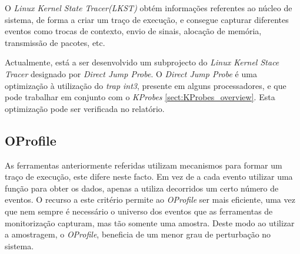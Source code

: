 O \textit{Linux Kernel State Tracer(LKST)} obtém informações referentes ao núcleo de sistema, de forma a criar um traço de execução, e consegue capturar diferentes eventos como trocas de contexto, envio de sinais, alocação de memória, transmissão de pacotes, etc.

\label{cap:djprobe}
Actualmente, está a ser desenvolvido um subprojecto do \textit{Linux Kernel Stace Tracer} designado por \textit{Direct Jump Probe}.
O \textit{Direct Jump Probe} é uma optimização à utilização do \textit{trap int3}, presente em alguns processadores, e que pode trabalhar em conjunto com o \textit{KProbes} \ref{sect:KProbes_overview}.
Esta optimização pode ser verificada no relatório\cite{Hiramatsu2005}.
 
\subsection{OProfile}\label{cap:Oprofile_overview}
As ferramentas anteriormente referidas utilizam mecanismos para formar um traço de execução, este difere neste facto.
Em vez de a cada evento utilizar uma função para obter os dados, apenas a utiliza decorridos um certo número de eventos.
O recurso a este critério permite ao \textit{OProfile} ser mais eficiente, uma vez que nem sempre é necessário o universo dos eventos que as ferramentas de monitorização capturam, mas tão somente uma amostra.
Deste modo ao utilizar a amostragem, o \textit{OProfile}, beneficia de um menor grau de perturbação no sistema\cite{Will:TuninProgrOProf}.


